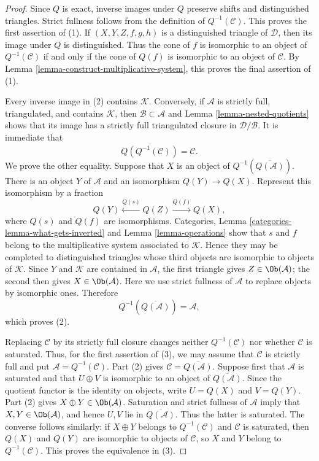 \begin{proof}
Since $Q$ is exact, inverse images under $Q$ preserve shifts and
distinguished triangles. Strict fullness follows from the definition of
$Q^{-1}(\mathcal{C})$. This proves the first assertion of (1). If
$(X,Y,Z,f,g,h)$ is a distinguished triangle of $\mathcal{D}$, then its
image under $Q$ is distinguished. Thus the cone of $f$ is isomorphic to
an object of $Q^{-1}(\mathcal{C})$ if and only if the cone of $Q(f)$ is
isomorphic to an object of $\mathcal{C}$. By
Lemma \ref{lemma-construct-multiplicative-system}, this proves the final
assertion of (1).

Every inverse image in (2) contains $\mathcal{K}$. Conversely, if
$\mathcal{A}$ is strictly full, triangulated, and contains
$\mathcal{K}$, then $\mathcal{B}\subset\mathcal{A}$ and
Lemma \ref{lemma-nested-quotients} shows that its image has a strictly
full triangulated closure in $\mathcal{D}/\mathcal{B}$. It is immediate
that
$$
\overline{Q(Q^{-1}(\mathcal{C}))}=\mathcal{C}.
$$
We prove the other equality. Suppose that $X$ is an object of
$Q^{-1}(\overline{Q(\mathcal{A})})$. There is an object $Y$ of
$\mathcal{A}$ and an isomorphism $Q(Y)\to Q(X)$. Represent this
isomorphism by a fraction
$$
Q(Y) \xleftarrow{Q(s)} Q(Z) \xrightarrow{Q(f)} Q(X),
$$
where $Q(s)$ and $Q(f)$ are isomorphisms. Categories, Lemma
\ref{categories-lemma-what-gets-inverted} and
Lemma \ref{lemma-operations} show that $s$ and $f$ belong to the
multiplicative system associated to $\mathcal{K}$. Hence they may be
completed to distinguished triangles whose third objects are isomorphic
to objects of $\mathcal{K}$. Since $Y$ and $\mathcal{K}$ are contained
in $\mathcal{A}$, the first triangle gives $Z\in\Ob(\mathcal{A})$; the
second then gives $X\in\Ob(\mathcal{A})$. Here we use strict fullness of
$\mathcal{A}$ to replace objects by isomorphic ones. Therefore
$$
Q^{-1}(\overline{Q(\mathcal{A})})=\mathcal{A},
$$
which proves (2).

Replacing $\mathcal{C}$ by its strictly full closure changes neither
$Q^{-1}(\mathcal{C})$ nor whether $\mathcal{C}$ is saturated. Thus, for
the first assertion of (3), we may assume that $\mathcal{C}$ is strictly
full and put $\mathcal{A}=Q^{-1}(\mathcal{C})$. Part (2) gives
$\mathcal{C}=\overline{Q(\mathcal{A})}$. Suppose first that
$\mathcal{A}$ is saturated and that
$U\oplus V$ is isomorphic to an object of
$\overline{Q(\mathcal{A})}$. Since the quotient functor is the identity
on objects, write $U=Q(X)$ and $V=Q(Y)$. Part (2) gives
$X\oplus Y\in\Ob(\mathcal{A})$. Saturation and strict fullness of
$\mathcal{A}$ imply that $X,Y\in\Ob(\mathcal{A})$, and hence $U,V$ lie
in $\overline{Q(\mathcal{A})}$. Thus the latter is saturated. The converse
follows similarly: if $X\oplus Y$ belongs to $Q^{-1}(\mathcal{C})$ and
$\mathcal{C}$ is saturated, then $Q(X)$ and $Q(Y)$ are isomorphic to
objects of
$\mathcal{C}$, so $X$ and $Y$ belong to $Q^{-1}(\mathcal{C})$. This
proves the equivalence in (3).


\end{proof}
